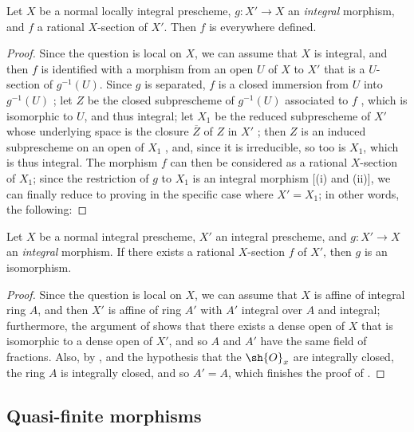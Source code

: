 \begin{corollary}[6.1.14]
\label{II.6.1.14}
Let $X$ be a normal locally integral prescheme, $g:X'\to X$ an \emph{integral} morphism, and $f$ a rational $X$-section of $X'$.
Then $f$ is everywhere defined.
\end{corollary}

\begin{proof}
Since the question is local on $X$, we can assume that $X$ is integral, and then $f$ is identified with a morphism from an open $U$ of $X$ to $X'$  that is a $U$-section of $g^{-1}(U)$.
Since $g$ is separated, $f$ is a closed immersion from $U$ into $g^{-1}(U)$ ;
let $Z$ be the closed subprescheme of $g^{-1}(U)$ associated to $f$ , which is isomorphic to $U$, and thus integral;
let $X_1$ be the reduced subprescheme of $X'$ whose underlying space is the closure $\overline{Z}$ of $Z$ in $X'$ ;
then $Z$ is an induced subprescheme on an open of $X_1$ , and, since it is irreducible, so too is $X_1$, which is thus integral.
The morphism $f$ can then be considered as a rational $X$-section of $X_1$;
since the restriction of $g$ to $X_1$ is an integral morphism [(i) and (ii)], we can finally reduce to proving  in the specific case where $X'=X_1$;
in other words, the following:
\end{proof}

\begin{corollary}[6.1.15]
\label{II.6.1.15}
Let $X$ be a normal integral prescheme, $X'$ an integral prescheme, and $g:X'\to X$ an \emph{integral} morphism.
If there exists a rational $X$-section $f$ of $X'$, then $g$ is an isomorphism.
\end{corollary}

\begin{proof}
Since the question is local on $X$, we can assume that $X$ is affine of integral ring $A$, and then $X'$ is affine of ring $A'$ with $A'$ integral over $A$  and integral;
furthermore, the argument of  shows that there exists a dense open of $X$ that is isomorphic to a dense open of $X'$, and so $A$ and $A'$ have the same field of fractions.
Also, by , and the hypothesis that the $\sh{O}_x$ are integrally closed, the ring $A$ is integrally closed, and so $A'=A$, which finishes the proof of .
\end{proof}


\subsection{Quasi-finite morphisms}
\label{subsection:II.6.2}

